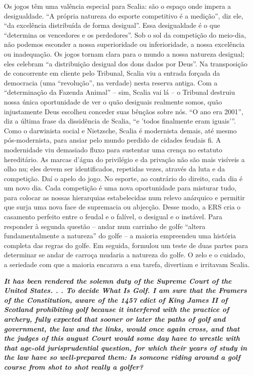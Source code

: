 Os jogos têm uma valência especial para Scalia: são o espaço onde impera a desigualdade. “A própria natureza do esporte competitivo é a medição”, diz ele, “da excelência distribuída de forma desigual”. Essa desigualdade é o que “determina os vencedores e os perdedores”. Sob o sol da competição do meio-dia, não podemos esconder a nossa superioridade ou inferioridade, a nossa excelência ou inadequação. Os jogos tornam clara para o mundo a nossa natureza desigual; eles celebram “a distribuição desigual dos dons dados por Deus”. Na transposição de concorrente em cliente pelo Tribunal, Scalia viu a entrada forçada da democracia (uma “revolução”, na verdade) nesta reserva antiga. Com a “determinação da Fazenda Animal” – sim, Scalia vai lá – o Tribunal destruiu nossa única oportunidade de ver o quão desiguais realmente somos, quão injustamente Deus escolheu conceder suas bênçãos sobre nós. “O ano era 2001”, diz a última frase da dissidência de Scalia, “e 'todos finalmente eram iguais'”. Como o darwinista social e Nietzsche, Scalia é modernista demais, até mesmo pós-modernista, para ansiar pelo mundo perdido de cidades feudais fi. A modernidade viu demasiado fluxo para sustentar uma crença no estatuto hereditário. As marcas d'água do privilégio e da privação não são mais visíveis a olho nu; eles devem ser identificados, repetidas vezes, através da luta e da competição. Daí o apelo do jogo. No esporte, ao contrário do direito, cada dia é um novo dia. Cada competição é uma nova oportunidade para misturar tudo, para colocar as nossas hierarquias estabelecidas num relevo anárquico e permitir que surja uma nova face de supremacia ou abjecção. Desse modo, a ERS cria o casamento perfeito entre o feudal e o falível, o desigual e o instável. Para responder à segunda questão – andar num carrinho de golfe “altera fundamentalmente a natureza” do golfe – a maioria empreendeu uma história completa das regras do golfe. Em seguida, formulou um teste de duas partes para determinar se andar de carroça mudaria a natureza do golfe. O zelo e o cuidado, a seriedade com que a maioria encarava a sua tarefa, divertiam e irritavam Scalia.
 
\par
 

 \textbf{\textit{It has been rendered the solemn duty of the Supreme Court of the United States. . . To decide What Is Golf. I am sure that the Framers of the Constitution, aware of the 1457 edict of King James II of Scotland prohibiting golf because it interfered with the practice of archery, fully expected that sooner or later the paths of golf and government, the law and the links, would once again cross, and that the judges of this august Court would some day have to wrestle with that age-old jurisprudential question, for which their years of study in the law have so well-prepared them: Is someone riding around a golf course from shot to shot really a golfer?} }  
 
